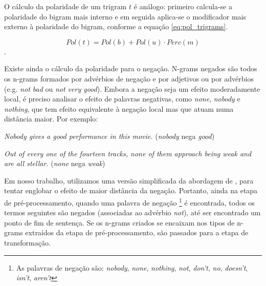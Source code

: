 \documentclass[template.tex]{subfiles}
\begin{document}
O cálculo da polaridade de um trigram $t$ é análogo: primeiro calcula-se a polaridade do bigram mais interno e em seguida aplica-se o modificador mais externo à polaridade do bigram, conforme a equação \ref{eq:pol_trigrams}.

\begin{equation} 
Pol(t) = Pol(b) + Pol(u) \cdot Perc(m)
\label{eq:pol_trigrams}
\end{equation}.

Existe ainda o cálculo da polaridade para o negação. N-grams negados são todos os n-grams formados por advérbios de negação e por adjetivos ou por advérbios (e.g. \textit{not bad} ou \textit{not very good}). Embora a negação seja um efeito moderadamente local, é preciso analisar o efeito de palavras negativas, como \textit{none}, \textit{nobody} e \textit{nothing}, que tem efeito equivalente à negação local \cite{taboada2011lexicon} mas que atuam numa distância maior. Por exemplo:

\begin{example}
\textit{Nobody gives a good performance in this movie.} (\textit{nobody} nega \textit{good})
\label{ex:far_neg_1}
\end{example}

\begin{example}
\textit{Out of every one of the fourteen tracks, none of them approach being weak and are all stellar.} (\textit{none} nega \textit{weak})
\label{ex:far_neg_2}
\end{example}

Em nosso trabalho, utilizamos uma versão simplificada da abordagem de , para tentar englobar o efeito de maior distância da negação. Portanto, ainda na etapa de pré-processamento, quando uma palavra de negação \footnote{As palavras de negação são: \textit{nobody}, \textit{none}, \textit{nothing}, \textit{not}, \textit{don't}, \textit{no}, \textit{doesn't}, \textit{isn't}, \textit{aren't}} é encontrada, todos os termos seguintes são negados (associadas ao advérbio \textit{not}), até ser encontrado um ponto de fim de sentença. Se os n-grams criados se encaixam nos tipos de n-grams extraídos da etapa de pré-processamento, são passados para a etapa de transformação. 
\end{document}
